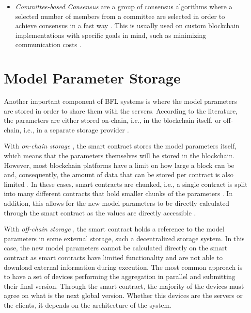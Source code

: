 \begin{itemize}
    \item \textit{Committee-based Consensus} are a group of consensus algorithms where a selected number of members from a committee are selected in order to achieve consensus in a fast way \cite{qu_blockchain-enabled_2022}. This is usually used on custom blockchain implementations with specific goals in mind, such as minimizing communication costs \cite{9293091}.
\end{itemize}

\section{Model Parameter Storage}\label{related_work:param_storage}

Another important component of BFL systems is where the model parameters are stored in order to share them with the servers. According to the literature, the parameters are either stored on-chain, i.e., in the blockchain itself, or off-chain, i.e., in a separate storage provider \cite{10.48550/arxiv.2104.10501}.

With \textit{on-chain storage} \cite{9274451, baffle, demo, 8733825, 9524833, 8894364, 9184854, 8893114}, the smart contract stores the model parameters itself, which means that the parameters themselves will be stored in the blockchain. However, most blockchain platforms have a limit on how large a block can be and, consequently, the amount of data that can be stored per contract is also limited \cite{9274451}. In these cases, smart contracts are chunked, i.e., a single contract is split into many different contracts that hold smaller chunks of the parameters \cite{baffle}. In addition, this allows for the new model parameters to be directly calculated through the smart contract as the values are directly accessible  \cite{9274451}.
    
With \textit{off-chain storage} \cite{10.1145/3319535.3363256, 10.48550/arxiv.2011.07516, 8945913, 10.48550/arxiv.2202.02817, 10.48550/arxiv.2007.03856, 10.48550/arxiv.1910.12603, Peyvandi2022, 9170559}, the smart contract holds a reference to the model parameters in some external storage, such a decentralized storage system. In this case, the new model parameters cannot be calculated directly on the smart contract as smart contracts have limited functionality and are not able to download external information during execution. The most common approach is to have a set of devices performing the aggregation in parallel and submitting their final version. Through the smart contract, the majority of the devices must agree on what is the next global version. Whether this devices are the servers or the clients, it depends on the architecture of the system.

